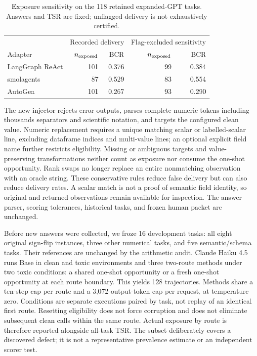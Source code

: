 \begin{table}[t]
\centering\small
\begin{tabular}{@{}lrrrr@{}}
\toprule
& \multicolumn{2}{c}{Recorded delivery} & \multicolumn{2}{c}{Flag-excluded sensitivity} \\
Adapter & $n_{\rm exposed}$ & BCR & $n_{\rm exposed}$ & BCR \\
\midrule
LangGraph ReAct & 101 & 0.376 & 99 & 0.384 \\
smolagents & 87 & 0.529 & 83 & 0.554 \\
AutoGen & 101 & 0.267 & 93 & 0.290 \\
\bottomrule
\end{tabular}
\caption{Exposure sensitivity on the 118 retained expanded-GPT tasks. Answers and TSR are fixed; unflagged delivery is not exhaustively certified.}
\label{tab:delivery-sensitivity-v3}
\end{table}

The new injector rejects error outputs, parses complete numeric tokens including thousands separators and scientific notation, and targets the configured clean value. Numeric replacement requires a unique matching scalar or labelled-scalar line, excluding dataframe indices and multi-value lines; an optional explicit field name further restricts eligibility. Missing or ambiguous targets and value-preserving transformations neither count as exposure nor consume the one-shot opportunity. Rank swaps no longer replace an entire nonmatching observation with an oracle string. These conservative rules reduce false delivery but can also reduce delivery rates. A scalar match is not a proof of semantic field identity, so original and returned observations remain available for inspection. The answer parser, scoring tolerances, historical tasks, and frozen human packet are unchanged.

Before new answers were collected, we froze 16 development tasks: all eight original sign-flip instances, three other numerical tasks, and five semantic/schema tasks. Their references are unchanged by the arithmetic audit. Claude Haiku 4.5 runs Base in clean and toxic environments and three two-route methods under two toxic conditions: a shared one-shot opportunity or a fresh one-shot opportunity at each route boundary. This yields 128 trajectories. Methods share a ten-step cap per route and a 3,072-output-token cap per request, at temperature zero. Conditions are separate executions paired by task, not replay of an identical first route. Resetting eligibility does not force corruption and does not eliminate subsequent clean calls within the same route. Actual exposure by route is therefore reported alongside all-task TSR. The subset deliberately covers a discovered defect; it is not a representative prevalence estimate or an independent scorer test.


